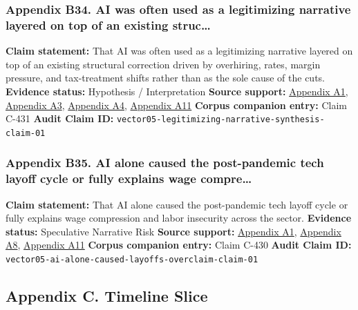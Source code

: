 \documentclass[
  american,
  11pt,
  letterpaper,
]{article}
\begin{document}
\subsubsection{Appendix B34. AI was often used as a legitimizing
narrative layered on top of an existing
struc\ldots{}}\label{appendix-b34-ai-was-often-used-as-a-legitimizing-narrative-layered-on-top-of-an-existing-struc}

\textbf{Claim statement:} That AI was often used as a legitimizing
narrative layered on top of an existing structural correction driven by
overhiring, rates, margin pressure, and tax-treatment shifts rather than
as the sole cause of the cuts. \textbf{Evidence status:} Hypothesis /
Interpretation \textbf{Source support:}
\hyperref[appendix-a1-notice-2023-63-guidance-on-section-174-and-specified-research-or-experimental-expenditures]{Appendix
A1},
\hyperref[appendix-a3-mark-zuckerberg-s-message-to-meta-employees]{Appendix
A3},
\hyperref[appendix-a4-ai-exuberance-masks-broad-weakness-in-tech-sector-say-investors]{Appendix
A4}, \hyperref[appendix-a11-annual-economic-report-2026]{Appendix A11}
\textbf{Corpus companion entry:} Claim C-431 \textbf{Audit Claim ID:}
\texttt{vector05-legitimizing-narrative-synthesis-claim-01}

\subsubsection{Appendix B35. AI alone caused the post-pandemic tech
layoff cycle or fully explains wage
compre\ldots{}}\label{appendix-b35-ai-alone-caused-the-post-pandemic-tech-layoff-cycle-or-fully-explains-wage-compre}

\textbf{Claim statement:} That AI alone caused the post-pandemic tech
layoff cycle or fully explains wage compression and labor insecurity
across the sector. \textbf{Evidence status:} Speculative Narrative Risk
\textbf{Source support:}
\hyperref[appendix-a1-notice-2023-63-guidance-on-section-174-and-specified-research-or-experimental-expenditures]{Appendix
A1},
\hyperref[appendix-a8-meta-posts-lower-q4-profit-announces-huge-stock-buyback]{Appendix
A8}, \hyperref[appendix-a11-annual-economic-report-2026]{Appendix A11}
\textbf{Corpus companion entry:} Claim C-430 \textbf{Audit Claim ID:}
\texttt{vector05-ai-alone-caused-layoffs-overclaim-claim-01}

\subsection{Appendix C. Timeline
Slice}\label{appendix-c.-timeline-slice}
\end{document}
